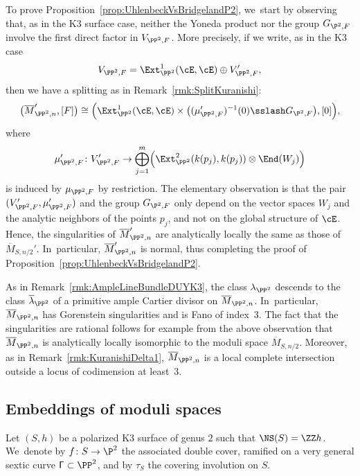 To prove Proposition~\ref{prop:UhlenbeckVsBridgelandP2}, we~start by observing that, as in the K3 surface case, neither the Yoneda product nor the group $G_{\P^2,F}$ involve the first direct factor in $V_{\PP^2,F}$.
More precisely, if we write, as in the K3 case
\[
V_{\PP^2,F} = \Ext^1_{\PP^2}(\cE,\cE) \oplus V_{\PP^2,F}',
\]
then we have a splitting as in Remark~\ref{rmk:SplitKuranishi}:
\begin{equation*}\label{eq:SplittingP2}
\bigl(\overline{M}_{\PP^2,n}',[F]\bigr)\cong \Bigl(\Ext^1_{\PP^2}(\cE,\cE) \times \bigl((\mu_{\PP^2,F}')^{-1}(0)\sslash G_{\P^2,F}\bigr),[0]\Bigr),
\end{equation*}
where
\[
\mu_{\PP^2,F}'\colon V_{\PP^2,F}'\to \bigoplus_{j=1}^m \Bigl(\Ext^2_{\PP^2}(k(p_j),k(p_j))\otimes \End(W_j) \Bigr)
\]
is induced by $\mu_{\PP^2,F}$ by restriction.
The elementary observation is that the pair $(V_{\PP^2,F}',\mu_{\PP^2,F}')$ and the group $G_{\P^2,F}$ only depend on the vector spaces $W_j$ and the analytic neighbors of the points $p_j$, and not on the global structure of $\cE$.
Hence, the singularities of $\overline{M}_{\PP^2,n}'$ are analytically locally the same as those of $\overline{M}_{S,n/2}'$. In~particular, $\overline{M}_{\PP^2,n}'$ is normal, thus completing the proof of Proposition~\ref{prop:UhlenbeckVsBridgelandP2}.

\begin{rema}\label{rmk:AmpleLineBundleDUYP2}
As in Remark~\ref{rmk:AmpleLineBundleDUYK3}, the class $\lambda_{\PP^2}$ descends to the class $\overline{\lambda}{}_{\PP^2}$ of a primitive ample Cartier divisor on $\overline{M}_{\PP^2,n}$. In~particular, $\overline{M}_{\PP^2,n}$ has Gorenstein singularities and is Fano of index~3.
The fact that the singularities are rational follows for example from the above observation that $\overline{M}_{\PP^2,n}$ is analytically locally isomorphic to the moduli space $\overline{M}_{S,n/2}$.
Moreover, as in Remark~\ref{rmk:KuranishiDelta1}, $\overline{M}_{\PP^2,n}$ is a local complete intersection outside a locus of codimension at least~3. \end{rema}

\subsection{Embeddings of moduli spaces}\label{subsec:EmbeddingsModuliSpaces}

Let $(S,h)$ be a polarized K3 surface of genus $2$ such that $\NS(S)=\ZZ h$. We~denote by $f\colon S \to \P^2$ the associated double cover, ramified on a very general sextic curve $\mathsf{\Gamma}\subset \PP^2$, and by $\tau_S$ the covering involution on $S$.

